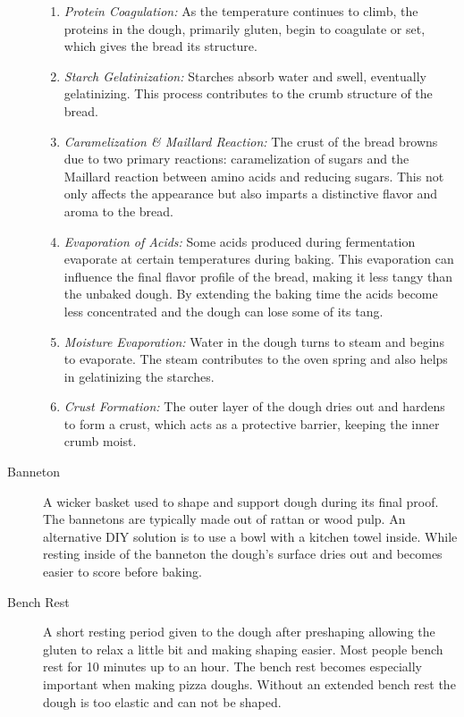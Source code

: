 \begin{description}
\begin{enumerate}
\item \emph{Protein Coagulation:}  As the temperature continues to climb, the proteins
in the dough, primarily gluten, begin to coagulate or set, which gives the bread its
structure.

\item \emph{Starch Gelatinization:}  Starches absorb water and swell, eventually
gelatinizing. This process contributes to the crumb structure of the bread.

\item \emph{Caramelization \& Maillard Reaction:}  The crust of the bread browns due
to two primary reactions: caramelization of sugars and the Maillard reaction between
amino acids and reducing sugars. This not only affects the appearance but also imparts
a distinctive flavor and aroma to the bread.

\item \emph{Evaporation of Acids:} Some acids produced during fermentation evaporate at
certain temperatures during baking. This evaporation can influence the final flavor
profile of the bread, making it less tangy than the unbaked dough. By extending the
baking time the acids become less concentrated and the dough can lose some of its tang.

\item \emph{Moisture Evaporation:} Water in the dough turns to steam and begins to
evaporate. The steam contributes to the oven spring and also helps in gelatinizing
the starches.

\item \emph{Crust Formation:} The outer layer of the dough dries out and hardens to
form a crust, which acts as a protective barrier, keeping the inner crumb moist.
\end{enumerate}

\item[Banneton] A wicker basket used to shape and support dough during its final
proof. The bannetons are typically made out of rattan or wood pulp. An alternative
DIY solution is to use a bowl with a kitchen towel inside. While resting inside of
the banneton the dough’s surface dries out and becomes easier to score before baking.

\item[Bench Rest] A short resting period given to the dough after preshaping
allowing the gluten to relax a little bit and making shaping easier. Most people
bench rest for 10 minutes up to an hour. The bench rest becomes especially important
when making pizza doughs. Without an extended bench rest the dough is too elastic and
can not be shaped.


\end{description}
